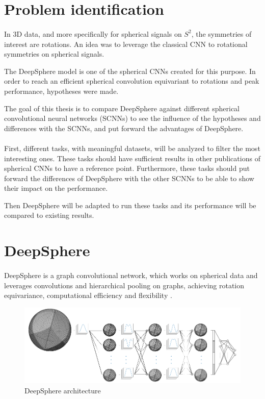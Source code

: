 \documentclass[11pt]{report}
\begin{document}
\section{Problem identification}
\paragraph*{}
In 3D data, and more specifically for spherical signals on $S^2$, the symmetries of interest are rotations. An idea was to leverage the classical CNN to rotational symmetries on spherical signals.

The DeepSphere model \cite{perraudin_deepsphere:_2018} is one of the spherical CNNs created for this purpose. In order to reach an efficient spherical convolution equivariant to rotations and peak performance, hypotheses were made.

The goal of this thesis is to compare DeepSphere against different spherical convolutional neural networks (SCNNs) to see the influence of the hypotheses and differences with the SCNNs, and put forward the advantages of DeepSphere.

\paragraph*{}
First, different tasks, with meaningful datasets, will be analyzed to filter the most interesting ones. These tasks should have sufficient results in other publications of spherical CNNs to have a reference point. Furthermore, these tasks should put forward the differences of DeepSphere with the other SCNNs to be able to show their impact on the performance. 

Then DeepSphere will be adapted to run these tasks and its performance will be compared to existing results.

\section{DeepSphere}
\paragraph*{}
DeepSphere is a graph convolutional network, which works on spherical data and leverages convolutions and hierarchical pooling on graphs, achieving rotation equivariance, computational efficiency and flexibility \cite{perraudin_deepsphere:_2018}.

\clearpage
\begin{figure}[!ht]
    \centering
    \includegraphics[width=0.8\linewidth]{figure2-Blogpost-SCNN.png}
    \caption{DeepSphere architecture}
    \label{fig:deepsphere}
\end{figure}
\end{document}

